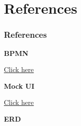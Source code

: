 \documentclass[20pt]{beamer}
\numberwithin{figure}{section}
\begin{document}
\section{References}

\begin{frame}

\frametitle{References}

\begin{thebibliography}{99}

\textbf{\footnotesize{BPMN}} 

\href{https://lucid.app/lucidchart/b2026979-cc63-4912-9203-273b7b90250b/edit?invitationId=inv_3a784afb-b535-477c-9474-34c729a9983a}{\underline{\footnotesize{Click here}}}

\vspace{15}

\textbf{\footnotesize{Mock UI}} 

\href{https://www.figma.com/file/ICHc0R3d4z9MT3rn3unpq2/ISD-MOCK-UI?type=design&node-id=0-1&mode=design}{\underline{\footnotesize{Click here}}}

\vspace{15}

\textbf{\footnotesize{ERD}} 


\end{thebibliography}
\end{frame}
\end{document}
